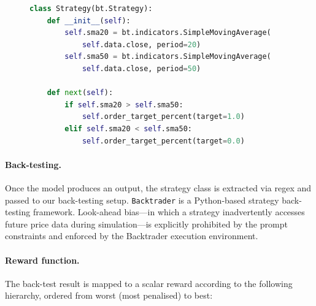 \documentclass[conference]{IEEEtran}
\begin{document}
\begin{figure}[t]
\begin{lstlisting}[language=Python,
                   caption={Example strategy generated by Qwen2.5-32B (fine-tuned) for TSLA.},
                   label={lst:tsla-strategy},
                   basicstyle=\ttfamily\footnotesize]
class Strategy(bt.Strategy):
    def __init__(self):
        self.sma20 = bt.indicators.SimpleMovingAverage(
            self.data.close, period=20)
        self.sma50 = bt.indicators.SimpleMovingAverage(
            self.data.close, period=50)

    def next(self):
        if self.sma20 > self.sma50:
            self.order_target_percent(target=1.0)
        elif self.sma20 < self.sma50:
            self.order_target_percent(target=0.0)
\end{lstlisting}
\end{figure}

\paragraph{Back-testing.}
Once the model produces an output, the strategy class is extracted via regex and passed
to our back-testing setup. \texttt{Backtrader} \cite{backtrader2024} is a
Python-based strategy back-testing framework. Look-ahead bias---in which a strategy
inadvertently accesses future price data during simulation---is explicitly prohibited by
the prompt constraints and enforced by the Backtrader execution environment.

\paragraph{Reward function.}
The back-test result is mapped to a scalar reward according to the following hierarchy,
ordered from worst (most penalised) to best:

\begin{table}[t]
  \centering
  \caption{Reward function: outcome categories ranked from worst to best.}
  \label{tab:reward}
\end{table}
\end{document}
